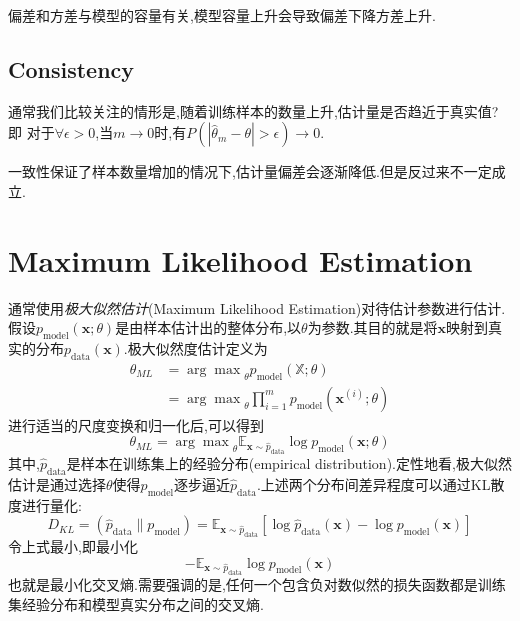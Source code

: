偏差和方差与模型的容量有关,模型容量上升会导致偏差下降方差上升.

\subsection{Consistency}\label{subsec:consistency}

通常我们比较关注的情形是,随着训练样本的数量上升,估计量是否趋近于真实值?即
对于$\forall\epsilon>0$,当$m\to0$时,有$P(|\hat\theta_m-\theta|>\epsilon)\to0$.

一致性保证了样本数量增加的情况下,估计量偏差会逐渐降低.但是反过来不一定成立.

\section{Maximum Likelihood Estimation}

通常使用\textit{极大似然估计}(Maximum Likelihood Estimation)对待估计参数进行估计.假设$p_{\text{model}}(\mathbf x;\theta)$是由样本估计出的整体分布,以$\theta$为参数.其目的就是将$\mathbf x$映射到真实的分布$p_{\text{data}}(\mathbf x)$.极大似然度估计定义为
\begin{equation}\begin{split}
\theta_{ML}&={\arg\max}_{\theta}p_{\text{model}}(\mathbb X;\theta)\\
&={\arg\max}_{\theta}\prod_{i=1}^mp_{\text{model}}(\mathbf x^{(i)};\theta)
\end{split}\end{equation}
进行适当的尺度变换和归一化后,可以得到
\begin{equation}
\theta_{ML}={\arg\max}_{\theta}\mathbb E_{\mathbf x\sim\hat p_{\text{data}}}\log p_{\text{model}}(\mathbf x;\theta)
\end{equation}
其中,$\hat p_{\text{data}}$是样本在训练集上的经验分布(empirical distribution).定性地看,极大似然估计是通过选择$\theta$使得$p_{\text{model}}$逐步逼近$\hat p_{\text{data}}$.上述两个分布间差异程度可以通过KL散度进行量化:
\begin{equation}
D_{KL}=(\hat p_{\text{data}}\|p_{\text{model}})=\mathbb E_{\mathbf x\sim\hat p_{\text{data}}}[\log\hat p_{\text{data}}(\mathbf x)-\log p_{\text{model}}(\mathbf x)]
\end{equation}
令上式最小,即最小化
\begin{equation}
-\mathbb E_{\mathbf x\sim\hat p_{\text{data}}}\log p_{\text{model}}(\mathbf x)
\end{equation}
也就是最小化交叉熵.需要强调的是,任何一个包含负对数似然的损失函数都是训练集经验分布和模型真实分布之间的交叉熵.

